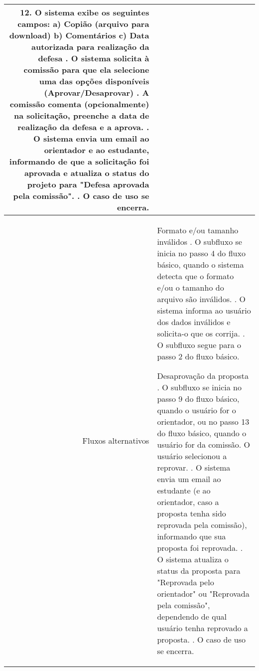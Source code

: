 \begin{longtable}{r p{12cm}}
                12. O sistema exibe os seguintes campos: \newline
                    \hspace*{1cm} a) Copião (arquivo para download) \newline 
                    \hspace*{1cm} b) Comentários \newline 
                    \hspace*{1cm} c) Data autorizada para realização da defesa \newline
                13. O sistema solicita à comissão para que ela selecione uma das opções disponíveis (Aprovar/Desaprovar) \newline
                14. A comissão comenta (opcionalmente) na solicitação, preenche a data de realização da defesa e a aprova. \newline
                15. O sistema envia um email ao orientador e ao estudante, informando de que a solicitação foi aprovada e atualiza o status do projeto para "Defesa aprovada pela comissão".    \newline
                16. O caso de uso se encerra. \newline
               \\ \hline
Fluxos alternativos & Formato e/ou tamanho inválidos \newline
                        1. O subfluxo se inicia no passo 4 do fluxo básico, quando o sistema detecta que o formato e/ou o tamanho do arquivo são inválidos. \newline
                        2. O sistema informa ao usuário dos dados inválidos e solicita-o que os corrija. \newline
                        3. O subfluxo segue para o passo 2 do fluxo básico. \newline
                    
                    Desaprovação da proposta \newline
                        1. O subfluxo se inicia no passo 9 do fluxo básico, quando o usuário for o orientador, ou no passo 13 do fluxo básico, quando o usuário for da comissão. O usuário selecionou a reprovar. \newline
                        2. O sistema envia um email ao estudante (e ao orientador, caso a proposta tenha sido reprovada pela comissão), informando que sua proposta foi reprovada. \newline
                        3. O sistema atualiza o status da proposta para "Reprovada pelo orientador" ou "Reprovada pela comissão", dependendo de qual usuário tenha reprovado a proposta. \newline
                        4. O caso de uso se encerra. \newline
                    \\ \hline        
\end{longtable}





